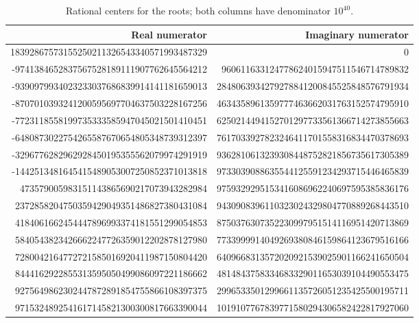 \begin{table}[htbp]
\centering
\begingroup\scriptsize\ttfamily
\begin{tabular}{rr}
\normalfont Real numerator & \normalfont Imaginary numerator\\\hline
18392867573155250211326543340571993487329 & 0\\
-9741384652837567528189111907762645564212 & 960611633124778624015947511546714789832\\
-9390979934023233037686839914141181659013 & 2848063934279278841200845525848576791934\\
-8707010393241200595697704637503228167256 & 4634358961359777463662031763152574795910\\
-7723118558199735333585947045021501410451 & 6250214494152701297733561366714273855663\\
-6480873022754265587670654805348739312397 & 7617033927823246411701558316834470378693\\
-3296776282962928450195355562079974291919 & 9362810613239308448752821856735617305389\\
-1442513481645415489053007250852371013818 & 9733039088635544125591234293715446465839\\
473579005983151143865690217073943282984 & 9759329295153416086962240697595385836176\\
2372858204750359429049351486827380431084 & 9430908396110323024329804770889268443510\\
4184061662454447896993374181551299054853 & 8750376307352230997951514116951420713869\\
5840543823426662247726359012202878127980 & 7733999914049269380846159864123679516166\\
7280042164772721585016920411987150804420 & 6409668313572020921539025901166241650504\\
8444162922855313595050499086097221186662 & 4814843758334683329011653039104490553475\\
9275649862302447872891854755866108397375 & 2996533501299661135726051235425500195711\\
9715324892541617145821300300817663390044 & 1019107767839771580294306582422817927060
\end{tabular}
\endgroup
\caption{Rational centers for the roots; both columns have denominator $10^{40}$.}
\label{cert:root-table}
\end{table}

